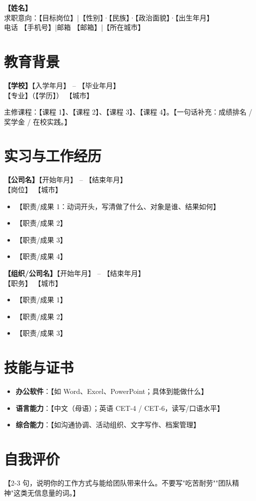 \documentclass[10.5pt,a4paper]{ctexart}
\newcommand{\entry}[4]{%
  \noindent\textbf{#1}\hfill #2\\[1pt]
  {\small #3 \hfill #4}\par\vspace{3pt}}
\begin{document}
\begin{center}
  {\Huge\bfseries 【姓名】}\\[4pt]
  {\small 求职意向：【目标岗位】\quad|\quad【性别】·【民族】·【政治面貌】·【出生年月】}\\[2pt]
  {\small 电话 【手机号】\quad|\quad 邮箱 【邮箱】\quad|\quad【所在城市】}
\end{center}

\vspace{2pt}

\section{教育背景}
\entry{【学校】}{【入学年月】 -- 【毕业年月】}{【专业】（【学历】）}{【城市】}
主修课程：【课程 1】、【课程 2】、【课程 3】、【课程 4】。【一句话补充：成绩排名 / 奖学金 / 在校实践。】

\section{实习与工作经历}
\entry{【公司名】}{【开始年月】 -- 【结束年月】}{【岗位】}{【城市】}
\begin{itemize}
  \item 【职责/成果 1：动词开头，写清做了什么、对象是谁、结果如何】
  \item 【职责/成果 2】
  \item 【职责/成果 3】
  \item 【职责/成果 4】
\end{itemize}

\entry{【组织/公司名】}{【开始年月】 -- 【结束年月】}{【职务】}{【城市】}
\begin{itemize}
  \item 【职责/成果 1】
  \item 【职责/成果 2】
  \item 【职责/成果 3】
\end{itemize}

\section{技能与证书}
\begin{itemize}
  \item \textbf{办公软件}：【如 Word、Excel、PowerPoint；具体到能做什么】
  \item \textbf{语言能力}：【中文（母语）；英语 CET-4 / CET-6，读写/口语水平】
  \item \textbf{综合能力}：【如沟通协调、活动组织、文字写作、档案管理】
\end{itemize}

\section{自我评价}
【2-3 句，说明你的工作方式与能给团队带来什么。不要写"吃苦耐劳""团队精神"这类无信息量的词。】
\end{document}
